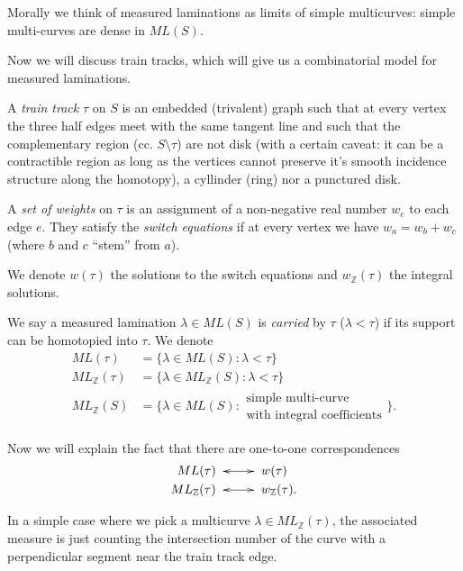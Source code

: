 Morally we think of measured laminations as
limits of simple multicurves:
simple multi-curves are dense in $ML(S)$.

\medskip\noindent
Now we will discuss train tracks, which will
give us a combinatorial model for measured
laminations.

\begin{definition}
\label{definition-train-track}
A {\it train track} $\tau$ on $S$ is an
embedded (trivalent)
graph such that at every vertex the three
half edges
meet with the same tangent line and such that
the complementary region (cc. $S \setminus
\tau$)
are not disk
(with a certain caveat: it can be a
contractible
region as long as the vertices cannot
preserve
it's smooth incidence structure
along the homotopy),
a cyllinder (ring) nor a punctured disk.

A {\it set of weights} on $\tau$ is an
assignment
of a non-negative real number $w_e$
to each edge $e$. They satisfy the {\it
switch equations}
if at every vertex we have $w_a=w_b+w_c$
(where $b$ and $c$ ``stem'' from $a$).

We denote $w(\tau)$ the solutions to the
switch equations
and $w_{\mathbb{Z}}(\tau)$ the integral
solutions.

We say a measured lamination $\lambda \in
ML(S)$
is {\it carried} by $\tau$ ($\lambda < \tau$)
if its support can be homotopied into $\tau$.
We denote
$$
\begin{aligned}
ML(\tau)&=\{\lambda \in ML(S):\lambda <
\tau\}\\
ML_{\mathbb{Z}}(\tau)&=\{\lambda \in
ML_{\mathbb{Z}}(S):\lambda <\tau\}\\
ML_{\mathbb{Z}}(S)&=\{\lambda \in
ML(S):\substack{\text{
simple multi-curve} \\ \text{with integral
coefficients}}\}.
\end{aligned}
$$
\end{definition}

\medskip\noindent
Now we will explain the fact that there are
one-to-one correspondences
$$
\begin{aligned}
ML(\tau)&\xymatrix{\ar@{<->}[r]&}w(\tau)\\
ML_{\mathbb{Z}}(\tau)&\xymatrix{\ar@{<->}[r]&
}w_{\mathbb{Z}}(\tau).
\end{aligned}
$$

\noindent
In a simple case where we pick a multicurve
$\lambda \in ML_{\mathbb{Z}}(\tau)$, the
associated measure
is just counting the intersection number
of the curve with a perpendicular segment
near
the train track edge.

